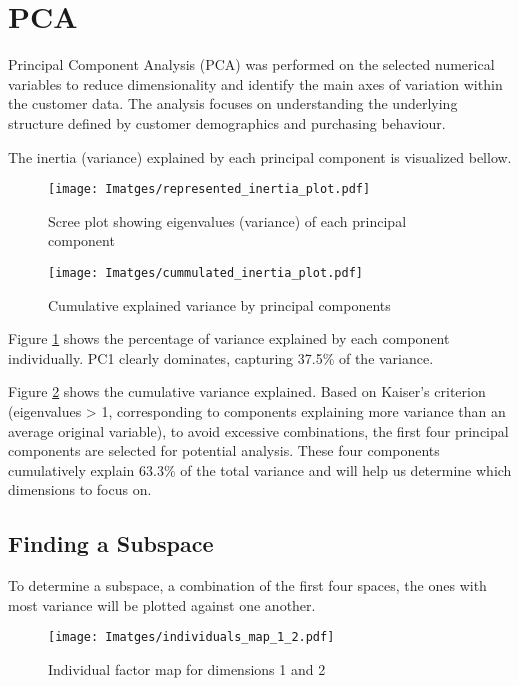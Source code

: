 \section{PCA}
Principal Component Analysis (PCA) was performed on the selected numerical variables to reduce dimensionality and identify the main axes of variation within the customer data. The analysis focuses on understanding the underlying structure defined by customer demographics and purchasing behaviour.

The inertia (variance) explained by each principal component is visualized bellow.

\begin{figure}[H]
    \centering
    \texttt{[image: Imatges/represented\_inertia\_plot.pdf]}
    \caption{Scree plot showing eigenvalues (variance) of each principal component}
    \label{fig:scree_plot}
\end{figure}

\begin{figure}[H]
    \centering
    \texttt{[image: Imatges/cummulated\_inertia\_plot.pdf]}
    \caption{Cumulative explained variance by principal components}
    \label{fig:cumulative_variance}
\end{figure}

Figure \ref{fig:scree_plot} shows the percentage of variance explained by each component individually. PC1 clearly dominates, capturing 37.5\% of the variance.

Figure \ref{fig:cumulative_variance} shows the cumulative variance explained. Based on Kaiser's criterion (eigenvalues > 1, corresponding to components explaining more variance than an average original variable), to avoid excessive combinations, the first four principal components are selected for potential analysis. These four components cumulatively explain 63.3\% of the total variance and will help us determine which dimensions to focus on.

\subsection{Finding a Subspace}

To determine a subspace, a combination of the first four spaces, the ones with most variance will be plotted against one another.

\begin{figure}[H]
    \centering
    \texttt{[image: Imatges/individuals\_map\_1\_2.pdf]}
    \caption{Individual factor map for dimensions 1 and 2}
    \label{fig:individuals_map_1_2}
\end{figure}

